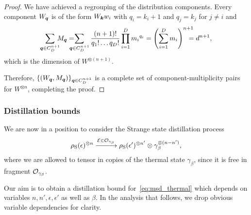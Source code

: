 \documentclass[pra,
aps,
twocolumn,
superscriptaddress,
groupedaddress,
nofootinbib,
reprint
]{revtex4-1}
\begin{document}
\begin{proof}
We have achieved a regrouping of the distribution components.
Every component $W_{\bm{q}}$ is of the form $W_{\bm{k}} w_i$ with $q_i = k_i + 1$ and $q_j = k_j$ for $j\neq i$ and 
\begin{align*}
	\sum_{\bmq \in C_D^{n+1}}  \hspace{-6pt} M_{\bmq} =  \hspace{-10pt} \sum_{\bmq \in C_D^{n+1}} \frac{(n+1)!}{q_1!\dots q_D!} \prod\limits_{i=1}^D {m_i}^{q_i} = 
	\left( \sum_{i=1}^D m_i \right)^{n+1} \hspace{-10pt} = d^{n+1},
\end{align*}
which is the dimension of $W^{\otimes (n+1)}$.

Therefore, $\{ (W_{\bm{q}}, M_{\bm{q}}) \}_{\bm{q} \in C_D^{n+1}}$ is a complete set of component-multiplicity pairs for $W^{\otimes n}$, completing the proof.
\end{proof}


\subsubsection{Distillation bounds}

We are now in a position to consider the Strange state distillation process
\begin{equation}\label{eq:msd_thermal}
		\rho_{\rm{S}}(\epsilon)^{\otimes n} \xrightarrow{\mathcal{E} \in \mathcal{O}_{\gamma_\beta}} \rho_{\rm{S}}(\epsilon')^{\otimes n'} \otimes \gamma_\beta^{\otimes (n-n')},
\end{equation}
where we are allowed to tensor in copies of the thermal state $\gamma_\beta$, since it is free in fragment $\mathcal{O}_{\gamma_\beta}$.

Our aim is to obtain a distillation bound for~\cref{eq:msd_thermal} which depends on variables $n, n', \epsilon, \epsilon'$ as well as $\beta$.
In the analysis that follows, we drop obvious variable dependencies for clarity.
\end{document}
